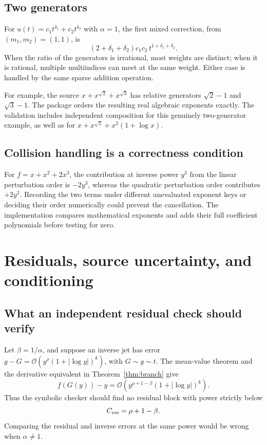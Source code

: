 \documentclass[11pt,a4paper]{article}
\numberwithin{equation}{section}
\theoremstyle{definition}\newtheorem{definition}[theorem]{Definition}
\theoremstyle{remark}\newtheorem{remark}[theorem]{Remark}
\newcommand{\bigO}{\mathcal O}
\begin{document}
\subsection{Two generators}
For \(u(t)=c_1t^{\delta_1}+c_2t^{\delta_2}\) with \(\alpha=1\), the first
mixed correction, from \((m_1,m_2)=(1,1)\), is
\[
 (2+\delta_1+\delta_2)c_1c_2\,
 t^{1+\delta_1+\delta_2}.
\]
When the ratio of the generators is irrational, most weights are distinct;
when it is rational, multiple multiindices can meet at the same weight.
Either case is handled by the same sparse addition operation.

For example, the source
\(x+x^{\sqrt2}+x^{\sqrt3}\) has relative generators
\(\sqrt2-1\) and \(\sqrt3-1\). The package orders the resulting real
algebraic exponents exactly. The validation includes independent composition
for this genuinely two-generator example, as well as for
\(x+x^{\sqrt2}+x^2(1+\log x)\).

\subsection{Collision handling is a correctness condition}
For \(f=x+x^2+2x^3\), the contribution at inverse power \(y^3\) from the
linear perturbation order is \(-2y^3\), whereas the quadratic perturbation
order contributes \(+2y^3\). Recording the two terms under different
unevaluated exponent keys or deciding their order numerically could prevent
the cancellation. The implementation compares mathematical exponents and
adds their full coefficient polynomials before testing for zero.

\section{Residuals, source uncertainty, and conditioning}
\label{sec:residuals}

\subsection{What an independent residual check should verify}
Let \(\beta=1/\alpha\), and suppose an inverse jet has error
\(g-G=\bigO(y^\rho(1+|\log y|)^k)\), with \(G\sim g\sim t\).
The mean-value theorem and the derivative equivalent in
Theorem~\ref{thm:branch} give
\begin{equation}\label{eq:residual-scale}
 f(G(y))-y
 =\bigO\!\left(y^{\rho+1-\beta}(1+|\log y|)^k\right).
\end{equation}
Thus the symbolic checker should find no residual block with power strictly
below
\begin{equation}\label{eq:residual-cutoff}
 C_{\rm res}=\rho+1-\beta.
\end{equation}
Comparing the residual and inverse errors at the same power would be wrong
when \(\alpha\ne1\).
\end{document}

